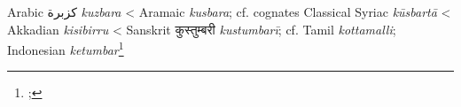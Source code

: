 \begin{etymology}\label{ety:kuzbura}
Arabic {كزبرة} \textit{kuzbara}
< Aramaic {} \textit{kusbara}; cf. cognates Classical Syriac  \textit{kūsbartā}
< Akkadian {} \textit{kisibirru}
< Sanskrit {कुस्तुम्बरी} \textit{kustumbarī}; cf. Tamil  \textit{kottamalli}; Indonesian \textit{ketumbar}\footnote{; }
\end{etymology}